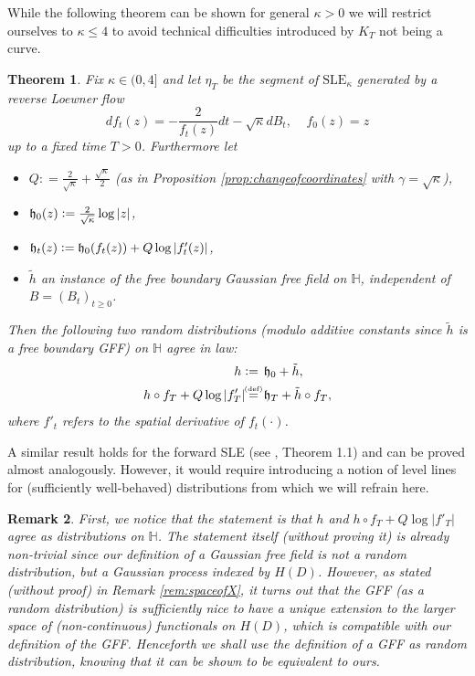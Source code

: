 \documentclass[11pt,reqno]{amsart}
\numberwithin{equation}{section}
\newtheorem{thm}{Theorem}[section]
\newtheorem{rem}[thm]{Remark}
\newcommand{\eqbydef}{\mathrel{\stackrel{\hspace*{-3mm}\text{\tiny(def)}\hspace*{-3mm}}{=}}}
\newcommand{\deq}{\mathrel{\mathop:}=}
\newcommand{\fh}{{\frak h}}
\begin{document}
While the following theorem can be shown for general $\kappa>0$ we will restrict ourselves to $\kappa\leq 4$ to avoid technical difficulties introduced by $K_T$ not being a curve.

\begin{thm}\label{thm:SLEresult}
	Fix $\kappa\in (0,4]$ and let $\eta_T$ be the segment of $\text{SLE}_\kappa$ generated by a reverse Loewner flow \begin{equation}\label{eq:defOfLoewnerFlow}
		df_t(z)=-\frac{2}{f_t(z)}dt-\sqrt\kappa dB_t, \;\;\;\; f_0(z)=z
	\end{equation}
	up to a fixed time $T>0$. Furthermore let \begin{itemize}
		\item $Q\deq\frac{2}{\sqrt\kappa}+\frac{\sqrt\kappa}{2}$ (as in Proposition \ref{prop:changeofcoordinates} with $\gamma=\sqrt\kappa$),
		\item $\fh_0(z)\deq\frac{2}{\sqrt\kappa}\log|z|$,
		\item $\fh_t(z)\deq\fh_0(f_t(z))+Q\log|f'_t(z)|$,
		\item $\tilde h$ an instance of the free boundary Gaussian free field on $\mathbb H$, independent of $B=(B_t)_{t\geq 0}$.
	\end{itemize}
	Then the following two random distributions (modulo additive constants since $\tilde h$ is a \emph{free boundary} GFF) on $\mathbb H$ agree in law:
	\begin{align*}
		h\deq & \hspace*{1.5mm}\fh_0+\tilde h,\\
		h\circ f_T+Q\log|f'_T|\eqbydef &\hspace*{1.5mm}\fh_T+\tilde h\circ f_T,
	\end{align*}
	where $f'_t$ refers to the spatial derivative of $f_t(\cdot)$.
\end{thm}
A similar result holds for the forward SLE (see \cite{She15}, Theorem 1.1) and can be proved almost analogously. However, it would require introducing a notion of level lines for (sufficiently well-behaved) distributions from which we will refrain here.
\begin{rem}
	First, we notice that the statement is that $h$ and $h\circ f_T+Q\log|f'_T|$ agree as distributions on $\mathbb H$. The statement itself (without proving it) is already non-trivial since our definition of a Gaussian free field is not a random distribution, but a Gaussian process indexed by $H(D)$. 
	However, as stated (without proof) in Remark \ref{rem:spaceofX}, it turns out that the GFF (as a random distribution) is sufficiently nice to have a unique extension to the larger space of (non-continuous) functionals on $H(D)$, which is compatible with our definition of the GFF.
	Henceforth we shall use the definition of a GFF as random distribution, knowing that it can be shown to be equivalent to ours.
\end{rem}
\end{document}
